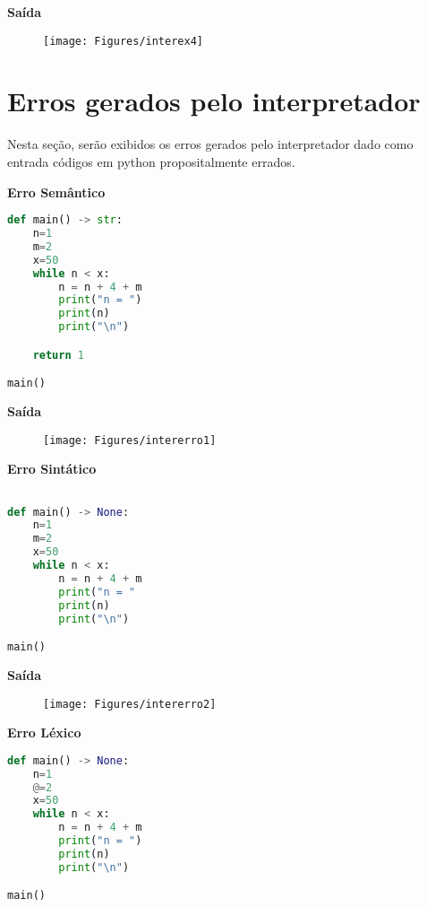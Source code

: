 \documentclass[hidelinks,12pt]{article}
\begin{document}
\textbf{{\large Saída}}

\begin{figure}[!h]
	\centering
	\texttt{[image: Figures/interex4]}
\end{figure}	

\section{Erros gerados pelo interpretador}

Nesta seção, serão exibidos os erros gerados pelo interpretador dado como entrada códigos em python propositalmente errados.

\vspace{0.5cm}
\textbf{\huge Erro Semântico}

\begin{lstlisting}[caption=sintatico.mli, language=python]
def main() -> str:
	n=1
	m=2
	x=50
	while n < x:
		n = n + 4 + m
		print("n = ")
		print(n)
		print("\n")

	return 1

main()
\end{lstlisting}


\textbf{{\large Saída}}

\begin{figure}[!h]
	\centering
	\texttt{[image: Figures/intererro1]}
\end{figure}

\vspace{0.5cm}
\textbf{\huge Erro Sintático}

\begin{lstlisting}[caption=sintatico.mli, language=python]

def main() -> None:
	n=1
	m=2
	x=50
	while n < x:
		n = n + 4 + m
		print("n = "
		print(n)
		print("\n")

main()

\end{lstlisting}


\textbf{{\large Saída}}

\begin{figure}[!h]
	\centering
	\texttt{[image: Figures/intererro2]}
\end{figure}


\vspace{0.5cm}
\textbf{\huge Erro Léxico}
	
\begin{lstlisting}[caption=sintatico.mli, language=python]
def main() -> None:
	n=1
	@=2
	x=50
	while n < x:
		n = n + 4 + m
		print("n = ")
		print(n)
		print("\n")

main()
\end{lstlisting}
\end{document}
